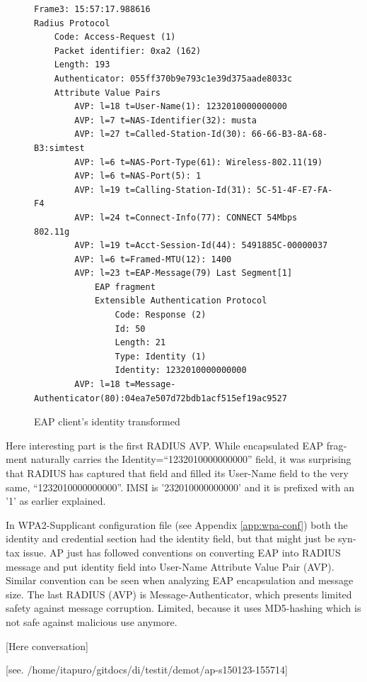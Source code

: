 \documentclass[12pt,a4paper,english]{tutthesis}
\begin{document}
\begin{otherlanguage}{english}
\scriptsize
\begin{figure}
\caption{EAP client's identity transformed}
\label{fig:capture}
\begin{verbatim}
Frame3: 15:57:17.988616
Radius Protocol
    Code: Access-Request (1)
    Packet identifier: 0xa2 (162)
    Length: 193
    Authenticator: 055ff370b9e793c1e39d375aade8033c
    Attribute Value Pairs
        AVP: l=18 t=User-Name(1): 1232010000000000
        AVP: l=7 t=NAS-Identifier(32): musta
        AVP: l=27 t=Called-Station-Id(30): 66-66-B3-8A-68-B3:simtest
        AVP: l=6 t=NAS-Port-Type(61): Wireless-802.11(19)
        AVP: l=6 t=NAS-Port(5): 1
        AVP: l=19 t=Calling-Station-Id(31): 5C-51-4F-E7-FA-F4
        AVP: l=24 t=Connect-Info(77): CONNECT 54Mbps 802.11g
        AVP: l=19 t=Acct-Session-Id(44): 5491885C-00000037
        AVP: l=6 t=Framed-MTU(12): 1400
        AVP: l=23 t=EAP-Message(79) Last Segment[1]
            EAP fragment
            Extensible Authentication Protocol
                Code: Response (2)
                Id: 50
                Length: 21
                Type: Identity (1)
                Identity: 1232010000000000
        AVP: l=18 t=Message-Authenticator(80):04ea7e507d72bdb1acf515ef19ac9527
\end{verbatim}
\end{figure}
\normalsize

Here interesting part is the first RADIUS AVP.
While encapsulated EAP fragment naturally carries the Identity=``1232010000000000''
field, it was surprising that RADIUS has captured that field and 
filled its User-Name field to the very same, ``1232010000000000''. 
IMSI is '232010000000000' and it is prefixed with
an '1' as earlier explained.

In WPA2-Supplicant configuration file (see Appendix \ref{app:wpa-conf}) both the identity and
credential section had the identity field, but that might 
just be syntax issue.
AP just has followed conventions on converting
EAP into RADIUS message and put identity field into User-Name
Attribute Value Pair (AVP).
Similar convention can be seen when analyzing EAP encapsulation and
message size. The last RADIUS (AVP) is 
Message-Authenticator, which presents limited safety against message 
corruption. Limited, because it uses MD5-hashing which is not safe
against malicious use anymore.

[Here conversation]



[see. /home/itapuro/gitdocs/di/testit/demot/ap-s150123-155714]


\end{otherlanguage}
\end{document}
